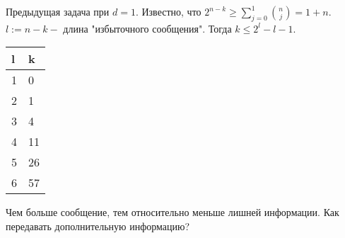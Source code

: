 
	Предыдущая задача при $d = 1$. Известно, что $\displaystyle 2^{n-k} \geqslant \sum_{j=0}^{1} \binom{n}{j} = 1+n$.\\
	$l := n - k -$ длина "избыточного сообщения". Тогда $k \leqslant 2^l - l - 1$.\\
	\begin{tabular}{ | l | l | }
		\hline
		l & k \\  \hline
		1 & 0 \\ \hline
		2 & 1 \\ \hline
		3 & 4 \\ \hline
		4 & 11 \\ \hline
		5 & 26 \\ \hline
		6 & 57 \\  \hline
	\end{tabular}
	Чем больше сообщение, тем относительно меньше лишней информации. Как передавать дополнительную информацию?


